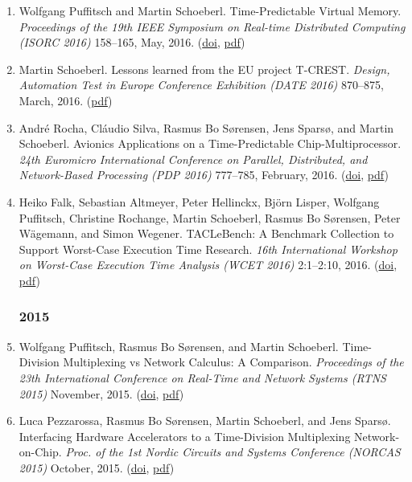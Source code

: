 \begin{enumerate}
\item Wolfgang Puffitsch and Martin Schoeberl.
 Time-Predictable Virtual Memory.
 \emph{Proceedings of the 19th IEEE Symposium on Real-time Distributed Computing (ISORC 2016)} 158--165, May, 2016.
(\href{http://dx.doi.org/10.1109/ISORC.2016.30}{doi}, \href{http://www.jopdesign.com/doc/tpmmu.pdf}{pdf})

\item Martin Schoeberl.
 Lessons learned from the EU project T-CREST.
 \emph{Design, Automation Test in Europe Conference Exhibition (DATE 2016)} 870--875, March, 2016.
(\href{http://www.jopdesign.com/doc/lessons.pdf}{pdf})

\item Andr{\'e} Rocha, Cl{\'a}udio Silva, Rasmus Bo S{\o}rensen, Jens Spars{\o}, and Martin Schoeberl.
 Avionics Applications on a Time-Predictable Chip-Multiprocessor.
 \emph{24th Euromicro International Conference on Parallel, Distributed, and Network-Based Processing (PDP 2016)} 777--785, February, 2016.
(\href{http://dx.doi.org/10.1109/PDP.2016.36}{doi}, \href{http://www.jopdesign.com/doc/gmvapp.pdf}{pdf})

\item Heiko Falk, Sebastian Altmeyer, Peter Hellinckx, Bj{\"o}rn Lisper, Wolfgang Puffitsch, Christine Rochange, Martin Schoeberl, Rasmus Bo S{\o}rensen, Peter W{\"a}gemann, and Simon Wegener.
 TACLeBench: A Benchmark Collection to Support Worst-Case Execution Time Research.
 \emph{16th International Workshop on Worst-Case Execution Time Analysis (WCET 2016)} 2:1--2:10, 2016.
(\href{http://dx.doi.org/10.4230/OASIcs.WCET.2016.2}{doi}, \href{http://www.jopdesign.com/doc/tacle-bench.pdf}{pdf})


\subsubsection*{2015}

\item Wolfgang Puffitsch, Rasmus Bo S{\o}rensen, and Martin Schoeberl.
 Time-Division Multiplexing vs Network Calculus: A Comparison.
 \emph{Proceedings of the 23th International Conference on Real-Time and Network Systems (RTNS 2015)} November, 2015.
(\href{http://dx.doi.org/10.1145/2834848.2834868}{doi}, \href{http://www.jopdesign.com/doc/tdmvsnc.pdf}{pdf})

\item Luca Pezzarossa, Rasmus Bo S{\o}rensen, Martin Schoeberl, and Jens Spars{\o}.
 Interfacing Hardware Accelerators to a Time-Division Multiplexing Network-on-Chip.
 \emph{Proc. of the 1st Nordic Circuits and Systems Conference (NORCAS 2015)} October, 2015.
(\href{http://dx.doi.org/10.1109/NORCHIP.2015.7364392}{doi}, \href{http://www.jopdesign.com/doc/tdm-fpu.pdf}{pdf})


\end{enumerate}
